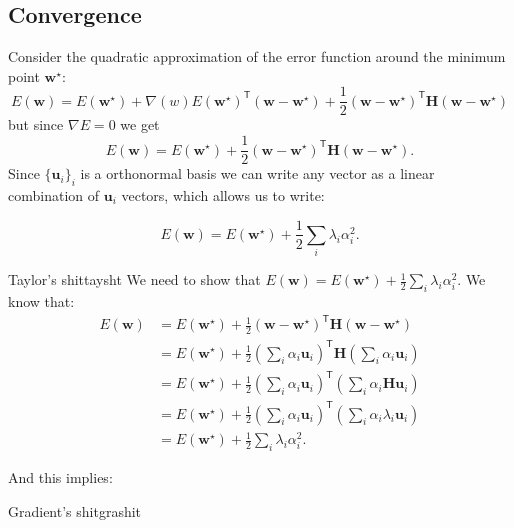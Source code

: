 \documentclass[a4paper,9pt]{extarticle}
\newcommand{\trans}[1]{{#1}^{\mathsf{T}}}
\begin{document}
\begin{multicols*}{2}
		\section{Convergence}
		Consider the quadratic approximation of the error function around the minimum point $\mathbf{w}^{\star}$:
		\begin{equation*}
			E(\mathbf{w})=E(\mathbf{w}^{\star})+\nabla(w)E(\mathbf{w}^{\star})^{\mathsf{T}}(\mathbf{w}-\mathbf{w}^{\star})+\frac{1}{2}(\mathbf{w-w}^{\star})^{\mathsf{T}}\mathbf{H}(\mathbf{w-w}^{\star})
		\end{equation*}
		but since $\nabla E=0$ we get
		\begin{equation*}
			E(\mathbf{w})=E(\mathbf{w}^{\star})+\frac{1}{2}(\mathbf{w-w}^{\star})^{\mathsf{T}}\mathbf{H}(\mathbf{w-w}^{\star}).
		\end{equation*}
		Since ${\{\mathbf{u}_{i}\}}_{i}$ is a orthonormal basis we can write any vector as a linear combination of $\mathbf{u}_{i}$ vectors, which allows us to write:
		\begin{riquadro}
			\begin{equation*}
				E(\mathbf{w})=E(\mathbf{w}^{\star})+\frac{1}{2}\sum_{i}\lambda_{i}\alpha_{i}^{2}.
			\end{equation*}
		\end{riquadro}
		\begin{myproof}{Taylor's shit}{taysht}
			We need to show that $E(\mathbf{w})=E(\mathbf{w}^{\star})+\frac{1}{2}\sum_{i}\lambda_{i}\alpha_{i}^{2}$. We know that:
			\begin{align*}
				E(\mathbf{w})&=E(\mathbf{w}^{\star})+\frac{1}{2}\trans{(\mathbf{w}-\mathbf{w}^{\star})}\mathbf{H}(\mathbf{w}-\mathbf{w}^{\star})\\
				&=E(\mathbf{w}^{\star})+\frac{1}{2}\trans{\left(\sum_{i}\alpha_{i}\mathbf{u}_{i}\right)}\mathbf{H}\left(\sum_{i}\alpha_{i}\mathbf{u}_{i}\right)\\
				&=E(\mathbf{w}^{\star})+\frac{1}{2}\trans{\left(\sum_{i}\alpha_{i}\mathbf{u}_{i}\right)}\left(\sum_{i}\alpha_{i}\mathbf{H}\mathbf{u}_{i}\right)\\
				&=E(\mathbf{w}^{\star})+\frac{1}{2}\trans{\left(\sum_{i}\alpha_{i}\mathbf{u}_{i}\right)}\left(\sum_{i}\alpha_{i}\lambda_{i}\mathbf{u}_{i}\right)\\
				&=E(\mathbf{w}^{\star})+\frac{1}{2}\sum_{i}\lambda_{i}\alpha_{i}^{2}.
			\end{align*}
		\end{myproof}
		And this implies:
		\begin{myproof}{Gradient's shit}{grashit}

\end{myproof}
\end{multicols*}
\end{document}
